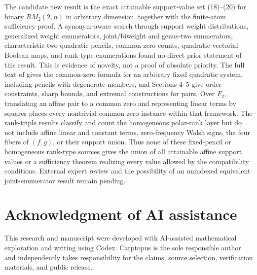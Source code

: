 \documentclass[11pt]{article}
\theoremstyle{remark}
\begin{document}
The candidate new result is the exact attainable support-value set (18)--(20) for binary $RM_2(2,n)$ in arbitrary dimension, together with the finite-atom sufficiency proof. A synonym-aware search through support weight distributions, generalized weight enumerators, joint/biweight and genus-two enumerators, characteristic-two quadratic pencils, common-zero counts, quadratic vectorial Boolean maps, and rank-type enumerations found no direct prior statement of this result. This is evidence of novelty, not a proof of absolute priority. The full text of \cite[Theorem 3.6]{ref7} gives the common-zero formula for an arbitrary fixed quadratic system, including pencils with degenerate members, and Sections 4--5 give order constraints, sharp bounds, and extremal constructions for pairs. Over $F_2$, translating an affine pair to a common zero and representing linear terms by squares places every nontrivial common-zero instance within that framework. The rank-triple results \cite{ref11,ref12} classify and count the homogeneous polar-rank layer but do not include affine linear and constant terms, zero-frequency Walsh signs, the four fibers of $(f,g)$, or their support union. Thus none of these fixed-pencil or homogeneous rank-type sources gives the union of all attainable affine support values or a sufficiency theorem realizing every value allowed by the compatibility conditions. External expert review and the possibility of an unindexed equivalent joint-enumerator result remain pending.

\section{Acknowledgment of AI assistance}

This research and manuscript were developed with AI-assisted mathematical exploration and writing using Codex. Carptopus is the sole responsible author and independently takes responsibility for the claims, source selection, verification materials, and public release.
\end{document}
